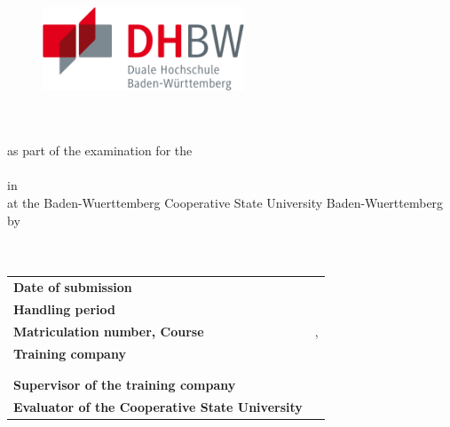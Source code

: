 
\thispagestyle{empty}
{
	\begin{titlepage}
		\enlargethispage{4cm}
		\begin{figure}
			\begin{minipage}{0.49\textwidth}
				\flushleft
			\end{minipage}
			\hfill
			\begin{minipage}{0.49\textwidth}
				\flushright
				\includegraphics[height=2.5cm]{images/logos/dhbw.pdf} 
			\end{minipage}
		\end{figure} 
		\vspace*{0.1cm}
		\begin{center}
			\huge{\textbf{\titel}}\\[1.5cm]
			\Large{\textbf{\arbeit}}\\[0.5cm]
			\normalsize{as part of the examination for the\\[1ex] \textbf{\abschluss}}\\[0.5cm]
			\Large{in \studiengang}\\[1ex]
			\normalsize{at the Baden-Wuerttemberg Cooperative State University Baden-Wuerttemberg}\\[1cm]
			\normalsize{by}\\[1ex] \Large{\textbf{\vorname\,\nachname}} \\[1cm]
			\normalsize{\bearbeitungsmonat}\\[2.25cm]
			\begin{spacing}{0.8}
				\begin{tabular}{ll}
					\textbf{Date of submission}				\hspace{4.5cm}					& \abgabeDatum\\[0.2cm]
					\textbf{Handling period}       				&  \bearbeitungszeitraum\\[0.2cm]
					\textbf{Matriculation number, Course}	   	&  \matrikelnr, \kurs\\[0.2cm]
					\textbf{Training company}              					 &  \firmaName\\
																							& \firmaStrasse \\
																							& \firmaPlz\\[0.2cm]
					\textbf{Supervisor of the training company}          &  \betreuerFirma\\[0.2cm]
					\textbf{Evaluator of the  Cooperative State University}    &  \betreuerDhbw\\[0.2cm]
				\end{tabular} 
			\end{spacing}
		\end{center}
	\end{titlepage}
}
